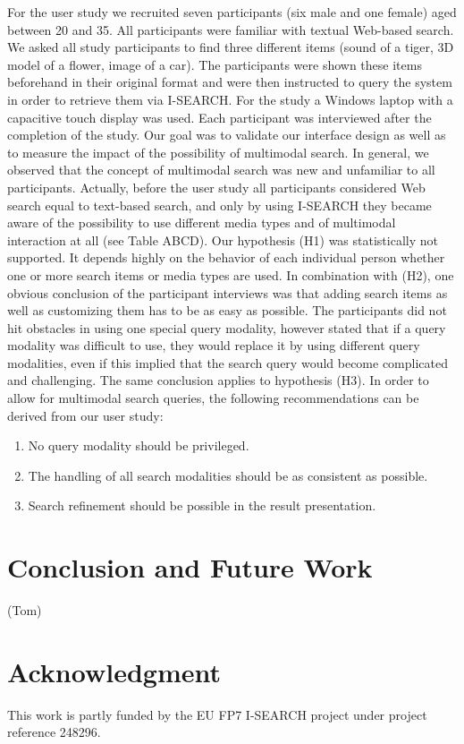 \documentclass[runningheads,a4paper]{llncs} \usepackage[utf8]{inputenc}
\begin{document}
For the user study we recruited seven participants (six male and one female) aged between 20 and 35. All participants were familiar with textual Web-based search. We asked all study participants to find three different items (sound of
a tiger, 3D model of a flower, image of a car). The participants were shown these items beforehand in their original format and were then instructed to query the system in order to retrieve them via \mbox{I-SEARCH}. For the study a Windows laptop with a capacitive touch display was used. Each participant was interviewed after the completion of the study. Our goal was to validate our interface design as well as to measure the impact of the possibility of multimodal search. In general, we observed that the concept of multimodal search was new and unfamiliar to all participants. Actually, before the user study all participants considered Web search equal to text-based search, and only by using \mbox{I-SEARCH} they became aware of the possibility to use different media types and of multimodal interaction at all (see Table ABCD). Our hypothesis (H1) was statistically not supported. It depends highly on the behavior of each individual person whether one or more search items or media types are used. In combination with (H2), one obvious conclusion of the participant interviews was that adding search items as well as customizing them has to be as easy as possible. The participants did not hit obstacles in using one special query modality, however stated that if a query modality was
difficult to use, they would replace it by using different query modalities, even if this implied that the search query would become complicated and challenging. The same conclusion applies to hypothesis (H3). In order to allow for  multimodal search queries, the following recommendations can be derived from our user study: 
\begin{enumerate}
  \item No query modality should be privileged.
  \item The handling of all search modalities should be as consistent as possible.
  \item Search refinement should be possible in the result presentation.  
\end{enumerate}

\section{Conclusion and Future Work}
(Tom)

\section{Acknowledgment}
This work is partly funded by the EU FP7 \mbox{I-SEARCH} project under project reference 248296.



\end{document}
